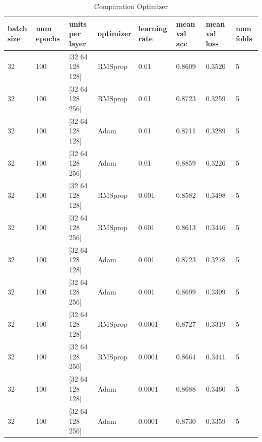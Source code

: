 \documentclass{book}
\begin{document}
            \begin{table}
                \begin{center}
                    \begin{tabular}{m{1cm}m{1cm}m{2.5cm}m{1.3cm}m{1cm}m{2cm}m{2cm}m{1cm}}
                        \midrule
                        batch size	& num epochs	& units per layer	& optimizer	& learning rate	& mean val acc	& mean val loss	& num folds \\
                        \midrule
                        32	& 100	& [32  64  128  128]	& RMSprop	& 0.01	& 0.8609 & 0.3520 & 5 \\
                        \midrule
                        32	& 100	& [32  64  128  256]	& RMSprop	& 0.01	& 0.8723 & 0.3259 & 5 \\
                        \midrule
                        32	& 100	& [32  64  128  128]	& Adam	& 0.01	& 0.8711 & 0.3289 & 5 \\
                        \midrule
                        32	& 100	& [32  64  128  256]	& Adam	& 0.01	& 0.8859 & 0.3226 & 5 \\
                        \midrule
                        32	& 100	& [32  64  128  128]	& RMSprop	& 0.001	& 0.8582 & 0.3498 & 5 \\
                        \midrule
                        32	& 100	& [32  64  128  256]	& RMSprop	& 0.001	& 0.8613 & 0.3446 & 5 \\
                        \midrule
                        32	& 100	& [32  64  128  128]	& Adam	& 0.001	& 0.8723 & 0.3278 & 5 \\
                        \midrule
                        32	& 100	& [32  64  128  256]	& Adam	& 0.001	& 0.8699 & 0.3309 & 5 \\
                        \midrule
                        32	& 100	& [32  64  128  128]	& RMSprop	& 0.0001	& 0.8727 & 0.3319 & 5 \\
                        \midrule
                        32	& 100	& [32  64  128  256]	& RMSprop	& 0.0001	& 0.8664 & 0.3441 & 5 \\
                        \midrule
                        32	& 100	& [32  64  128  128]	& Adam	& 0.0001	& 0.8688 & 0.3460 & 5 \\
                        \midrule
                        32	& 100	& [32  64  128  256]	& Adam	& 0.0001	& 0.8730 & 0.3359 & 5 \\
                        \midrule
                    \end{tabular}
                \end{center}
                \caption{\label{tab:optimizer}Comparation Optimizer}
            \end{table}
\end{document}

